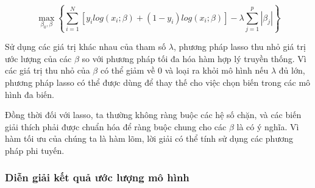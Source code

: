 {\large
$$
\max_{\beta_0, \beta} \left \{ \sum_{i = 1}^N [ y_i log (x_i ; \beta) + (1- y_i)log (x_i; \beta)] - \lambda \sum_{j = 1}^p|\beta_j|\right \}
$$
}

Sử dụng các giá trị khác nhau của tham số $\lambda$, phương pháp lasso thu nhỏ giá trị ước lượng của các $\beta$ so với phương pháp tối đa hóa hàm hợp lý truyền thống. Vì các giá trị thu nhỏ của $\beta$ có thể giảm về 0 và loại ra khỏi mô hình nếu $\lambda$ đủ lớn, phương pháp lasso có thể được dùng để thay thế cho việc chọn biến trong các mô hình đa biến.

Đồng thời đối với lasso, ta thường không ràng buộc các hệ số chặn, và các biến giải thích phải được chuẩn hóa để ràng buộc chung cho các $\beta$ là có ý nghĩa. Vì hàm tối ưu của chúng ta là hàm lõm, lời giải có thể tính sử dụng các phương pháp phi tuyến. %


\subsubsection{Diễn giải kết quả ước lượng mô hình}

